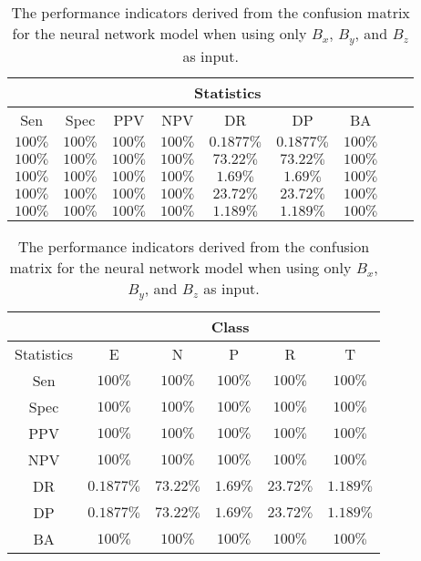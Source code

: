 \begin{table}[!ht]
	\centering
	\begin{tabular}{|c|c|c|c|c|c|c|c|c|}
		\hline
		 & \multicolumn{7}{c|}{Statistics} \\ \hline
		Sen & Spec & PPV & NPV & DR & DP & BA \\ \hline
		$100\%$ & $100\%$ & $100\%$ & $100\%$ & $0.1877\%$ & $0.1877\%$ & $100\%$ \\ \hline
		$100\%$ & $100\%$ & $100\%$ & $100\%$ & $73.22\%$ & $73.22\%$ & $100\%$ \\ \hline
		$100\%$ & $100\%$ & $100\%$ & $100\%$ & $1.69\%$ & $1.69\%$ & $100\%$ \\ \hline
		$100\%$ & $100\%$ & $100\%$ & $100\%$ & $23.72\%$ & $23.72\%$ & $100\%$ \\ \hline
		$100\%$ & $100\%$ & $100\%$ & $100\%$ & $1.189\%$ & $1.189\%$ & $100\%$ \\ \hline
	\end{tabular}
	\caption{The performance indicators derived from the confusion matrix for the neural network model when using only $B_{x}$, $B_{y}$, and $B_{z}$ as input.}
	\label{tab:cs:coord:nnet}
\end{table}

\begin{table}[!ht]
	\centering
	\begin{tabular}{|c|c|c|c|c|c|}
		\hline
		 & \multicolumn{5}{c|}{Class} \\ \hline
		Statistics & E & N & P & R & T \\ \hline
		Sen & $100\%$ & $100\%$ & $100\%$ & $100\%$ & $100\%$ \\ \hline
		Spec & $100\%$ & $100\%$ & $100\%$ & $100\%$ & $100\%$ \\ \hline
		PPV & $100\%$ & $100\%$ & $100\%$ & $100\%$ & $100\%$ \\ \hline
		NPV & $100\%$ & $100\%$ & $100\%$ & $100\%$ & $100\%$ \\ \hline
		DR & $0.1877\%$ & $73.22\%$ & $1.69\%$ & $23.72\%$ & $1.189\%$ \\ \hline
		DP & $0.1877\%$ & $73.22\%$ & $1.69\%$ & $23.72\%$ & $1.189\%$ \\ \hline
		BA & $100\%$ & $100\%$ & $100\%$ & $100\%$ & $100\%$ \\ \hline
	\end{tabular}
	\caption{The performance indicators derived from the confusion matrix for the neural network model when using only $B_{x}$, $B_{y}$, and $B_{z}$ as input.}
	\label{tab:cs:reverse:coord:nnet}
\end{table}

